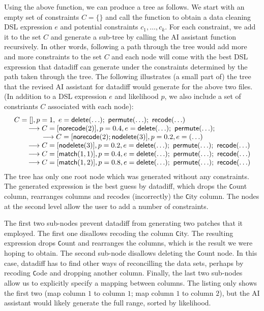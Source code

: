 \documentclass{article}
\begin{document}
Using the above function, we can produce a tree as follows. We start with an empty set of 
constraints $C=\{\}$ and call the function to obtain a data cleaning DSL expression $e$ and
potential constraints $c_1, \ldots, c_k$. For each constraint, we add it to the set $C$ and
generate a sub-tree by calling the AI assistant function recursively. In other words, following
a path through the tree would add more and more constraints to the set $C$ and each node will
come with the best DSL expression that datadiff can generate under the constraints determined
by the path taken through the tree. The following illustrates (a small part of) the tree that 
the revised AI assistant for datadiff would generate for the above two files. (In addition to a DSL 
expression $e$ and likelihood $p$, we also include a set of constriants $C$ associated with each 
node):
%
\begin{equation*}
\begin{array}{l}
C=[], p=1,~ e=\textnormal{\sffamily delete}(\ldots);~ \textnormal{\sffamily permute}(\ldots);~ \textnormal{\sffamily recode}(\ldots)\\
\qquad\longrightarrow C=[\textnormal{\sffamily norecode}(2)], p=0.4, e=\textnormal{\sffamily delete}(\ldots);~ \textnormal{\sffamily permute}(\ldots);\\
\qquad\qquad\longrightarrow C=[\textnormal{\sffamily norecode}(2); \textnormal{\sffamily nodelete}(3)], p=0.2, e=(\ldots)\\
\qquad\longrightarrow C=[\textnormal{\sffamily nodelete}(3)], p=0.2, e=\textnormal{\sffamily delete}(\ldots);~ \textnormal{\sffamily permute}(\ldots);~ \textnormal{\sffamily recode}(\ldots)\\
\qquad\longrightarrow C=[\textnormal{\sffamily match}(1,1)], p=0.4, e=\textnormal{\sffamily delete}(\ldots);~ \textnormal{\sffamily permute}(\ldots);~ \textnormal{\sffamily recode}(\ldots)\\
\qquad\longrightarrow C=[\textnormal{\sffamily match}(1,2)], p=0.8, e=\textnormal{\sffamily delete}(\ldots);~ \textnormal{\sffamily permute}(\ldots);~ \textnormal{\sffamily recode}(\ldots)\\
\end{array}
\end{equation*}
%
The tree has only one root node which was generated without any constraints. The generated expression
is the best guess by datadiff, which drops the {\texttt Count} column, rearranges columns and recodes
(incorrectly) the {\texttt City} column. The nodes at the second level allow the user to add a
number of constraints. 

The first two sub-nodes prevent datadiff from generating two patches that it employed. The first one
disallows recoding the column {\texttt City}. The resulting expression drops {\texttt Count} and
rearranges the columns, which is the result we were hoping to obtain. 
The second sub-node disallows deleting the {\texttt Count} node. In this case, datadiff has to
find other ways of reconcilling the data sets, perhaps by recoding {\texttt Code} and dropping
another column. Finally, the last two sub-nodes allow us to explicitly specify a mapping between
columns. The listing only shows the first two (map column $1$ to column $1$; map column $1$ to column $2$),
but the AI assistant would likely generate the full range, sorted by likelihood.
\end{document}
